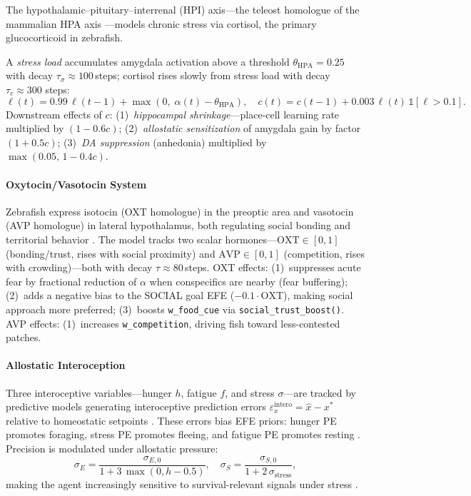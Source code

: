 \documentclass[12pt]{article}
\begin{document}
\begin{sloppypar}
The hypothalamic--pituitary--interrenal (HPI) axis---the teleost
homologue of the mammalian HPA axis \citep{wendelaar1997}---models
chronic stress via cortisol, the primary glucocorticoid in zebrafish.
\end{sloppypar}
A \emph{stress load} accumulates amygdala activation above a threshold
$\theta_\text{HPA} = 0.25$ with decay $\tau_\sigma \approx 100$\,steps;
cortisol rises slowly from stress load
with decay $\tau_c \approx 300$ steps:
\begin{equation}\label{eq:cortisol}
  \ell(t) = 0.99\,\ell(t{-}1) + \max(0,\;\alpha(t) - \theta_\text{HPA}),
\quad
  c(t) = c(t{-}1) + 0.003\,\ell(t)\,\mathbb{1}[\ell > 0.1].
\end{equation}
Downstream effects of $c$: (1)~\emph{hippocampal shrinkage}---place-cell
learning rate multiplied by $(1 - 0.6c)$; (2)~\emph{allostatic sensitization}
of amygdala gain by factor $(1 + 0.5c)$; (3)~\emph{DA suppression} (anhedonia)
multiplied by $\max(0.05,\,1 - 0.4c)$.

\paragraph{Oxytocin/Vasotocin System}

Zebrafish express isotocin (OXT homologue) in the preoptic area and
vasotocin (AVP homologue) in lateral hypothalamus, both regulating
social bonding and territorial behavior \citep{greenwood2008}.
The model tracks two scalar hormones---$\text{OXT} \in [0,1]$
(bonding/trust, rises with social proximity) and $\text{AVP} \in [0,1]$
(competition, rises with crowding)---both with decay $\tau \approx 80$\,steps.
OXT effects: (1)~suppresses acute fear by fractional reduction of
$\alpha$ when conspecifics are nearby (fear buffering); (2)~adds a
negative bias to the SOCIAL goal EFE ($-0.1 \cdot \text{OXT}$),
making social approach more preferred; (3)~boosts \texttt{w\_food\_cue}
via \texttt{social\_trust\_boost()}. AVP effects: (1)~increases
\texttt{w\_competition}, driving fish toward less-contested patches.

\paragraph{Allostatic Interoception}

Three interoceptive variables---hunger $h$, fatigue $f$, and
stress $\sigma$---are tracked by predictive models generating
interoceptive prediction errors $\varepsilon_x^\text{intero}
= \hat{x} - x^*$ relative to homeostatic setpoints
\citep{seth2016,barrett2015}.
These errors bias EFE priors: hunger PE promotes foraging, stress PE
promotes fleeing, and fatigue PE promotes resting \citep{pezzulo2015}.
Precision is modulated under allostatic pressure:
\begin{equation}\label{eq:allo_precision}
  \sigma_E = \frac{\sigma_{E,0}}{1 + 3\,\max(0, h - 0.5)},
  \quad
  \sigma_S = \frac{\sigma_{S,0}}{1 + 2\,\sigma_\text{stress}},
\end{equation}
making the agent increasingly sensitive to survival-relevant signals
under stress \citep{stephan2016}.
\end{document}
